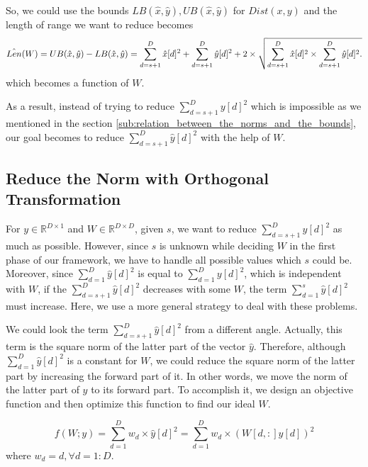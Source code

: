 So, we could use the bounds $LB(\hat{x},\hat{y}),UB(\hat{x},\hat{y})$ for $Dist(x,y)$ and the length of range we want to reduce becomes
\[
\hat{Len}(W) = UB(\hat{x},\hat{y}) - LB(\hat{x},\hat{y}) = \sum^D_{d=s+1}{\hat{x}[d]^2}+\sum^D_{d=s+1}{\hat{y}[d]^2} \notag \\
 +  2 \times \sqrt{\sum^D_{d=s+1}{\hat{x}[d]^2}\times \sum^D_{d=s+1}{\hat{y}[d]^2}.}\label{eq:len-range-hat}
\]
which becomes a function of $W$.

As a result, instead of trying to reduce $\sum^D_{d=s+1}{y[d]^2}$ which is impossible as we mentioned in the section \ref{sub:relation_between_the_norms_and_the_bounds}, our goal becomes to reduce $\sum^D_{d=s+1}{\hat{y}[d]^2}$ with the help of $W$.


\subsection{Reduce the Norm with Orthogonal Transformation} %
\label{ss:reduce_the_norm_with_orthogonal_transformation}

For $y\in \mathbb{R}^{D\times 1}$ and $W\in\mathbb{R}^{D\times D}$, given $s$, we want to reduce $\sum^D_{d=s+1}{\hat{y}[d]^2}$ as much as possible.  However, since $s$ is unknown while deciding $W$ in the first phase of our framework, we have to handle all possible values which $s$ could be.  Moreover, since $\sum^D_{d=1}{\hat{y}[d]^2}$ is equal to $\sum^D_{d=1}{y[d]^2}$, which is independent with $W$, if the $\sum^D_{d=s+1}{\hat{y}[d]^2}$ decreases with some $W$, the term $\sum^s_{d=1}{\hat{y}[d]^2}$ must increase.  Here, we use a more general strategy to deal with these problems.

We could look the term $\sum^D_{d=s+1}{\hat{y}[d]^2}$ from a different angle.  Actually, this term is the square norm of the latter part of the vector $\hat{y}$. Therefore, although $\sum^D_{d=1}{\hat{y}[d]^2}$ is a constant for $W$, we could reduce the square norm of the latter part by increasing the forward part of it.  In other words, we move the norm of the latter part of $y$ to its forward part.  To accomplish it, we design an objective function and then optimize this function to find our ideal $W$.

\begin{equation}\label{objective}
	f(W;y)=\sum^D_{d=1}{w_d\times\hat{y}[d]^2}=\sum^D_{d=1}{w_d\times(W[d,:]y[d])^2}
\end{equation}
where $w_d=d,  \forall d=1:D$.

